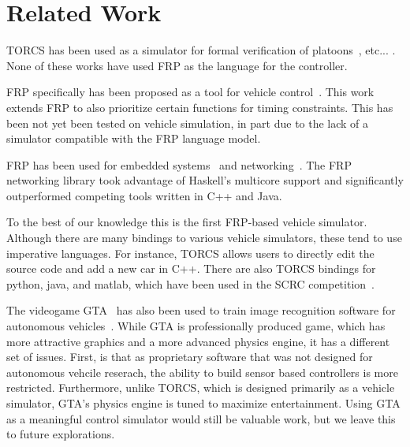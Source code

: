 \section{Related Work}

TORCS has been used as a simulator for formal verification of platoons~\cite{kamali2016formal}, etc... .
None of these works have used FRP as the language for the controller.


FRP specifically has been proposed as a tool for vehicle control~\cite{kazemi2016,zou2016}.
This work extends FRP to also prioritize certain functions for timing constraints.
This has been not yet been tested on vehicle simulation, in part due to the lack of a simulator compatible with the FRP language model.

FRP has been used for embedded systems~\cite{helbling2016juniper} and networking~\cite{voellmy2012scalable}.
The FRP networking library took advantage of Haskell's multicore support and significantly outperformed competing tools written in C++ and Java.


To the best of our knowledge this is the first FRP-based vehicle simulator.
Although there are many bindings to various vehicle simulators, these tend to use imperative languages.
For instance, TORCS allows users to directly edit the source code and add a new car in C++.
There are also TORCS bindings for python, java, and matlab, which have been used in the SCRC competition~\cite{SCRC}.

The videogame GTA~\cite{} has also been used to train image recognition software for autonomous vehicles~\cite{}.
While GTA is professionally produced game, which has more attractive graphics and a more advanced physics engine, it has a different set of issues.
First, is that as proprietary software that was not designed for autonomous vehcile reserach, the ability to build sensor based controllers is more restricted. 
Furthermore, unlike TORCS, which is designed primarily as a vehicle simulator, GTA's physics engine is tuned to maximize entertainment.
Using GTA as a meaningful control simulator would still be valuable work, but we leave this to future explorations.
